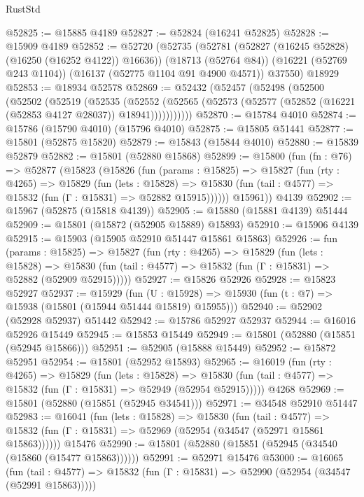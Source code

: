 \begin{lexlean}{RustStd}
\begin{coremodule}
@52825 := @15885 @4189
@52827 := @52824 (@16241 @52825)
@52828 := @15909 @4189
@52852 := @52720
    (@52735
      (@52781 (@52827 (@16245 @52828) (@16250 (@16252 @4122)) @16636))
      (@18713 (@52764 @84))
      (@16221 (@52769 @243 @1104))
      (@16137 (@52775 @1104 @91 @4900 @4571))
      @37550)
    @18929
@52853 := @18934 @52578
@52869 := @52432
    (@52457
      (@52498
        (@52500
          (@52502
            (@52519
              (@52535
                (@52552
                  (@52565 (@52573 (@52577 (@52852 (@16221 (@52853 @4127 @28037)) @18941)))))))))))
@52870 := @15784 @4010
@52874 := @15786 (@15790 @4010) (@15796 @4010)
@52875 := @15805 @51441
@52877 := @15801 (@52875 @15820)
@52879 := @15843 (@15844 @4010)
@52880 := @15839 @52879
@52882 := @15801 (@52880 @15868)
@52899 := @15800
    (fun (fn : @76) =>
    @52877
      (@15823
        (@15826
          (fun (params : @15825) =>
          @15827
            (fun (rty : @4265) =>
            @15829
              (fun (lets : @15828) =>
              @15830 (fun (tail : @4577) => @15832 (fun (Γ : @15831) => @52882 @15915))))))
        @15961))
    @4139
@52902 := @15967 (@52875 (@15818 @4139))
@52905 := @15880 (@15881 @4139) @51444
@52909 := @15801 (@15872 (@52905 @15889) @15893)
@52910 := @15906 @4139
@52915 := @15903 (@15905 @52910 @51447 @15861 @15863)
@52926 := fun (params : @15825) =>
  @15827
    (fun (rty : @4265) =>
    @15829
      (fun (lets : @15828) =>
      @15830 (fun (tail : @4577) => @15832 (fun (Γ : @15831) => @52882 (@52909 @52915)))))
@52927 := @15826 @52926
@52928 := @15823 @52927
@52937 := @15929
    (fun (U : @15928) => @15930 (fun (t : @7) => @15938 (@15801 (@15944 @51444 @15819) @15955)))
@52940 := @52902 (@52928 @52937) @51442
@52942 := @15786 @52927 @52937
@52944 := @16016 @52926 @15449
@52945 := @15853 @15449
@52949 := @15801 (@52880 (@15851 (@52945 @15866)))
@52951 := @52905 (@15888 @15449)
@52952 := @15872 @52951
@52954 := @15801 (@52952 @15893)
@52965 := @16019
    (fun (rty : @4265) =>
    @15829
      (fun (lets : @15828) =>
      @15830 (fun (tail : @4577) => @15832 (fun (Γ : @15831) => @52949 (@52954 @52915)))))
    @4268
@52969 := @15801 (@52880 (@15851 (@52945 @34541)))
@52971 := @34548 @52910 @51447
@52983 := @16041
    (fun (lets : @15828) =>
    @15830
      (fun (tail : @4577) =>
      @15832 (fun (Γ : @15831) => @52969 (@52954 (@34547 (@52971 @15861 @15863))))))
    @15476
@52990 := @15801 (@52880 (@15851 (@52945 (@34540 (@15860 (@15477 @15863))))))
@52991 := @52971 @15476
@53000 := @16065
    (fun (tail : @4577) => @15832 (fun (Γ : @15831) => @52990 (@52954 (@34547 (@52991 @15863)))))

\end{coremodule}
\end{lexlean}

